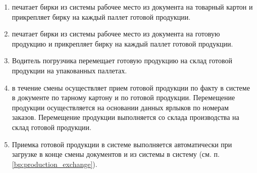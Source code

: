 \begin{enumerate}

\item  \gaoperator печатает бирки из системы \gofro рабочее место  из документа  на товарный картон и прикрепляет бирку %
на каждый паллет готовой продукции.
\item  \operator печатает бирки из системы \gofro рабочее место  из документа  на готовую продукцию и прикрепляет бирку %
на каждый паллет готовой продукции.

\item Водитель погрузчика перемещает готовую продукцию на склад готовой продукции на упакованных паллетах.

\item  \kladovshik в течение смены осуществляет прием готовой продукции по факту в системе \gofro в документе  по тарному картону и по готовой продукции. Перемещение продукции осуществляется на основании данных ярлыков по номерам заказов. %
Перемещение продукции выполняется со склада производства на склад готовой продукции.





\item Приемка готовой продукции в системе \erp выполняется автоматически при загрузке в конце смены документов  и  из системы \gofro в систему \erp (см. п. \ref{bp:production_exchange}).


\end{enumerate}


